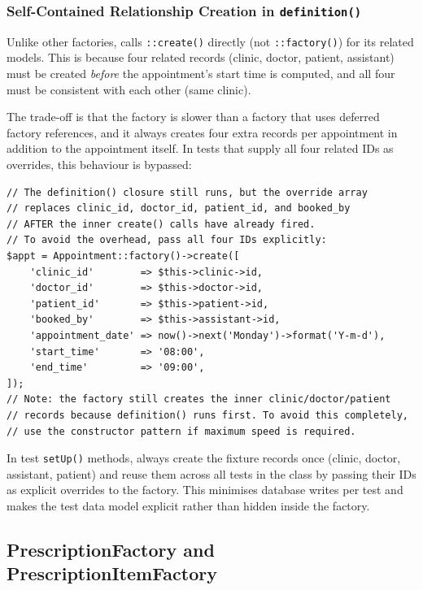 \subsubsection{Self-Contained Relationship Creation in \texttt{definition()}}

Unlike other factories,  calls
\texttt{::create()} directly (not \texttt{::factory()}) for its related
models. This is because four related records (clinic, doctor, patient,
assistant) must be created \emph{before} the appointment's start time is
computed, and all four must be consistent with each other (same clinic).

The trade-off is that the factory is slower than a factory that uses
deferred factory references, and it always creates four extra records per
appointment in addition to the appointment itself. In tests that supply
all four related IDs as overrides, this behaviour is bypassed:

\begin{lstlisting}[style=php, caption={Overriding all relationships avoids the factory chain.}, label={lst:appt-override}]
// The definition() closure still runs, but the override array
// replaces clinic_id, doctor_id, patient_id, and booked_by
// AFTER the inner create() calls have already fired.
// To avoid the overhead, pass all four IDs explicitly:
$appt = Appointment::factory()->create([
    'clinic_id'        => $this->clinic->id,
    'doctor_id'        => $this->doctor->id,
    'patient_id'       => $this->patient->id,
    'booked_by'        => $this->assistant->id,
    'appointment_date' => now()->next('Monday')->format('Y-m-d'),
    'start_time'       => '08:00',
    'end_time'         => '09:00',
]);
// Note: the factory still creates the inner clinic/doctor/patient
// records because definition() runs first. To avoid this completely,
// use the constructor pattern if maximum speed is required.
\end{lstlisting}

\begin{tipbox}
  In test \texttt{setUp()} methods, always create the fixture records
  once (clinic, doctor, assistant, patient) and reuse them across all
  tests in the class by passing their IDs as explicit overrides to the
  factory. This minimises database writes per test and makes the test
  data model explicit rather than hidden inside the factory.
\end{tipbox}

\subsection{PrescriptionFactory and PrescriptionItemFactory}

